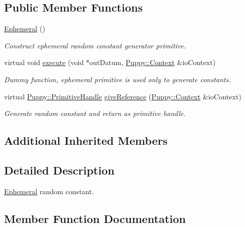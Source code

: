 \subsection*{Public Member Functions}
\begin{DoxyCompactItemize}
\item 
\hypertarget{classEphemeral_ac6c554dd7fc112356dc1794d5579f28e}{}\hyperlink{classEphemeral_ac6c554dd7fc112356dc1794d5579f28e}{Ephemeral} ()\label{classEphemeral_ac6c554dd7fc112356dc1794d5579f28e}

\begin{DoxyCompactList}\small\item\em Construct ephemeral random constant generator primitive. \end{DoxyCompactList}\item 
virtual void \hyperlink{classEphemeral_a69fb1365baddf81c9f1cd7c35a6bad16}{execute} (void $\ast$out\+Datum, \hyperlink{classPuppy_1_1Context}{Puppy\+::\+Context} \&io\+Context)
\begin{DoxyCompactList}\small\item\em Dummy function, ephemeral primitive is used only to generate constants. \end{DoxyCompactList}\item 
virtual \hyperlink{classPuppy_1_1PrimitiveHandle}{Puppy\+::\+Primitive\+Handle} \hyperlink{classEphemeral_a4c8bf775486a868d9011c4b9d93e7547}{give\+Reference} (\hyperlink{classPuppy_1_1Context}{Puppy\+::\+Context} \&io\+Context)
\begin{DoxyCompactList}\small\item\em Generate random constant and return as primitive handle. \end{DoxyCompactList}\end{DoxyCompactItemize}
\subsection*{Additional Inherited Members}


\subsection{Detailed Description}
\hyperlink{classEphemeral}{Ephemeral} random constant. 

\subsection{Member Function Documentation}
\hypertarget{classEphemeral_a69fb1365baddf81c9f1cd7c35a6bad16}{}
